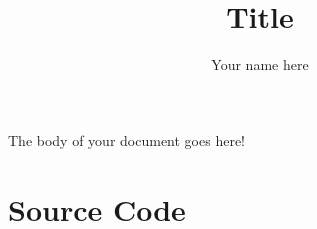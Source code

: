 \documentclass{article}
\title{Title}
\author{Your name here}
\begin{document}
\maketitle

The body of your document goes here!

\pagebreak
\appendix
\section*{Source Code}

\end{document}
